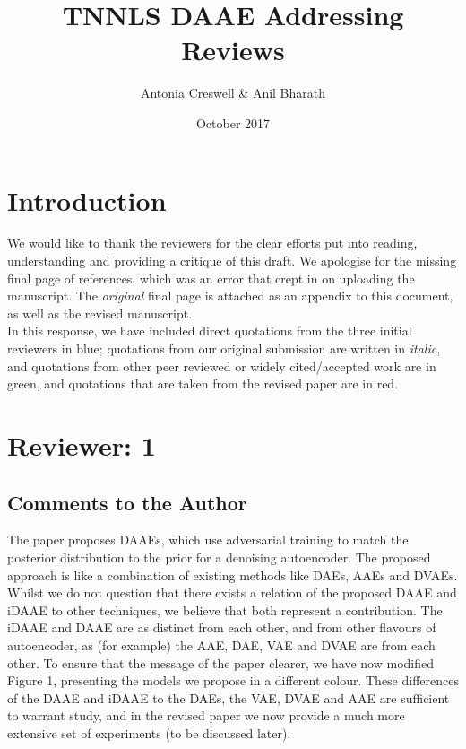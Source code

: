 \documentclass[a4paper,11pt]{article}
\title{TNNLS DAAE Addressing Reviews}
\author{Antonia Creswell \& Anil Bharath}
\date{October 2017}
\begin{document}
\maketitle
\section*{Introduction}
We would like to thank the reviewers for the clear efforts put into reading, understanding and providing a critique of this draft. We apologise for the missing final page of references, which was an error that crept in on uploading the manuscript.  The {\em original} final page is attached as an appendix to this document, as well as the revised manuscript. \\

In this response, we have included direct quotations from the three initial reviewers in {\color{blue}blue}; quotations from our original submission are written in {\em italic}, and quotations from other peer reviewed or widely cited/accepted work are in {\color{green}green}, and quotations that are taken from the revised paper are in {\color{red}red}.

\section*{Reviewer: 1}
\subsection*{Comments to the Author}
{\color{blue} The paper proposes DAAEs, which use adversarial training to match the posterior distribution to the prior for a denoising autoencoder. The proposed approach is like a combination of existing methods like DAEs, AAEs and DVAEs.}\\

Whilst we do not question that there exists a relation of the proposed DAAE and iDAAE to other techniques, we believe that both represent a contribution. The iDAAE and DAAE are as distinct from each other, and from other flavours of autoencoder, as (for example) the AAE, DAE, VAE and DVAE are from each other.  To ensure that the message of the paper clearer, we have now modified Figure 1, presenting the models we propose in a different colour.  These differences of the DAAE and iDAAE to the DAEs, the VAE, DVAE and AAE are sufficient to warrant study, and in the revised paper we now provide a much more extensive set of experiments (to be discussed later).\\
\end{document}
